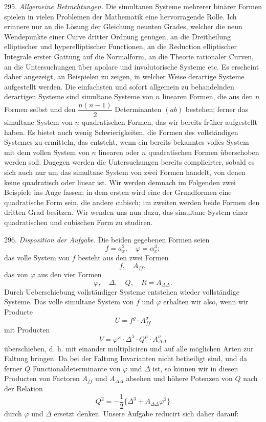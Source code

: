 \documentclass[11pt]{article}
\providecommand{\weberpage}[1]{}
\providecommand{\weq}[2]{\begin{equation}\tag{#1}#2\end{equation}}
\let\Delta\varDelta
\begin{document}
295. \textit{Allgemeine Betrachtungen.} Die simultanen Systeme mehrerer binärer Formen spielen in vielen Problemen der Mathematik eine hervorragende Rolle. Ich erinnere nur an die Lösung der Gleichung neunten Grades, welcher die neun Wendepunkte einer Curve dritter Ordnung genügen, an die Dreitheilung elliptischer und hyperelliptischer Functionen, an die Reduction elliptischer Integrale erster Gattung auf die Normalform, an die Theorie rationaler Curven, an die Untersuchungen über apolare und involutorische Systeme etc. Es erscheint daher angezeigt, an Beispielen zu zeigen, in welcher Weise derartige Systeme aufgestellt werden. Die einfachsten und sofort allgemein zu behandelnden derartigen Systeme sind simultane Systeme von $n$ linearen Formen, die aus den $n$ Formen selbst und den $\dfrac{n(n-1)}{2}$ Determinanten $(ab)$ bestehen; ferner das simultane System von $n$ quadratischen Formen, das wir bereits früher aufgestellt haben. Es bietet auch wenig Schwierigkeiten, die Formen des vollständigen Systemes zu ermitteln, das entsteht, wenn ein bereits bekanntes volles System mit dem vollen System von $n$ linearen oder $n$ quadratischen Formen überschoben werden soll. Dagegen werden die Untersuchungen bereits complicirter, sobald es sich auch nur um das simultane System von zwei Formen handelt, von denen keine quadratisch oder linear ist. Wir werden demnach im Folgenden zwei Beispiele ins Auge fassen; in dem ersten wird eine der Grundformen eine quadratische Form sein, die andere cubisch; im zweiten werden beide Formen den dritten Grad besitzen. Wir wenden uns nun dazu, das simultane System einer quadratischen und cubischen Form zu studiren.


\weberpage{321}

296. \textit{Disposition der Aufgabe.} Die beiden gegebenen Formen seien
\[
f = a_x^2, \quad \varphi = \alpha_x^3;
\]
das volle System von $f$ besteht aus den zwei Formen
\[
f, \quad A_{ff},
\]
das von $\varphi$ aus den vier Formen
\weq{2}{\varphi, \quad \Delta, \quad Q, \quad R = A_{\Delta\Delta}.}
Durch Ueberschiebung vollständiger Systeme entstehen wieder vollständige Systeme. Das volle simultane System von $f$ und $\varphi$ erhalten wir also, wenn wir Producte
\[
U = f^\varrho \cdot A_{ff}^\sigma
\]
mit Producten
\[
V = \varphi^\varkappa \cdot \Delta^\lambda \cdot Q^\mu \cdot A_{\Delta\Delta}^\nu
\]
überschieben, d. h. mit einander multipliciren und auf alle möglichen Arten zur Faltung bringen. Da bei der Faltung Invarianten nicht betheiligt sind, und da ferner $Q$ Functionaldeterminante von $\varphi$ und $\Delta$ ist, so können wir in diesen Producten von Factoren $A_{ff}$ und $A_{\Delta\Delta}$ absehen und höhere Potenzen von $Q$ nach der Relation
\[
Q^2 = -\frac{1}{2}\{\Delta^3 + A_{\Delta\Delta}\varphi^2\}
\]
durch $\varphi$ und $\Delta$ ersetzt denken. Unsere Aufgabe reducirt sich daher darauf:
\end{document}
